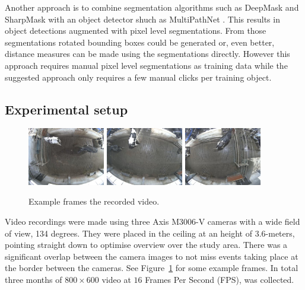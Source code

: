 \documentclass{cta-author}
\begin{document}
Another approach is to combine segmentation algorithms such as
DeepMask \cite{DBLP:journals/corr/PinheiroCD15} and
SharpMask \cite{DBLP:journals/corr/PinheiroLCD16} with an object detector shuch as 
MultiPathNet \cite{DBLP:journals/corr/ZagoruykoLLPGCD16}. This results in object detections augmented with pixel level segmentations. From those segmentations rotated bounding boxes could be generated or, even better, distance measures can be made using the segmentations directly. However this approach requires manual pixel level segmentations as training data while the suggested approach only requires a few manual clicks per training object.

\subsection{Experimental setup}

\begin{figure}[tb]
\begin{center}
  \includegraphics[width=0.3\textwidth]{old-2.jpg}
  \includegraphics[width=0.3\textwidth]{old-1.jpg}
  \includegraphics[width=0.3\textwidth]{old-0.jpg}
\end{center}
  \caption{Example frames the recorded video.}
  \label{fig:old}
\end{figure}


Video recordings were made using three Axis M3006-V cameras with a wide field of view, 134 degrees. They were placed in the ceiling at an height of $3.6$-meters, pointing straight down to optimise overview over the study area. There was a significant overlap between the camera images to not miss events taking place at the border between the cameras. See Figure~\ref{fig:old} for some example frames. In total three months of $800 \times 600$ video at $16$ Frames Per Second (FPS), was collected.
\end{document}
